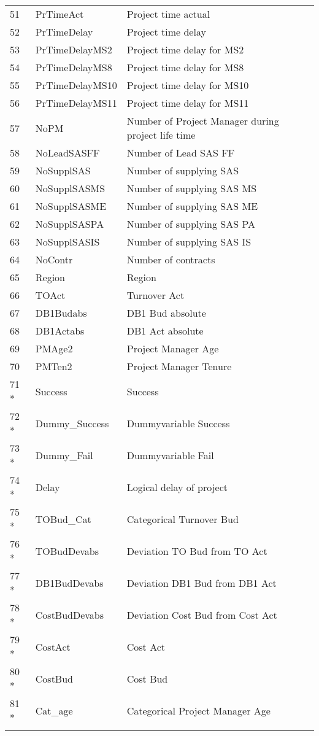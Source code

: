 \begin{longtable}[ht]{p{} p{}p{}}
	51    & PrTimeAct & Project time actual \\
	52    & PrTimeDelay & Project time delay \\
	53    & PrTimeDelayMS2 & Project time delay for MS2 \\
	54    & PrTimeDelayMS8 & Project time delay for MS8 \\
	55    & PrTimeDelayMS10 & Project time delay for MS10 \\
	56    & PrTimeDelayMS11 & Project time delay for MS11 \\
	57    & NoPM  & Number of Project Manager during project life time \\
	58    & NoLeadSASFF & Number of Lead SAS FF \\
	59    & NoSupplSAS & Number of supplying SAS \\
	60    & NoSupplSASMS & Number of supplying SAS MS \\
	61    & NoSupplSASME & Number of supplying SAS ME \\
	62    & NoSupplSASPA & Number of supplying SAS PA \\
	63    & NoSupplSASIS & Number of supplying SAS IS \\
	64    & NoContr & Number of contracts \\
	65    & Region & Region \\
	66    & TOAct & Turnover Act \\
	67    & DB1Budabs & DB1 Bud absolute \\
	68    & DB1Actabs & DB1 Act absolute \\
	69    & PMAge2 & Project Manager Age \\
	70    & PMTen2 & Project Manager Tenure \\
	71 *   & Success & Success \\
	72 *  & Dummy\_Success & Dummyvariable Success \\
	73 *   & Dummy\_Fail & Dummyvariable Fail \\
	74 *   & Delay & Logical delay of project \\
	75 *   & TOBud\_Cat & Categorical Turnover Bud \\
	76 *   & TOBudDevabs & Deviation TO Bud from TO Act \\
	77 *   & DB1BudDevabs & Deviation DB1 Bud from DB1 Act \\
	78 *   & CostBudDevabs & Deviation Cost Bud from Cost Act \\
	79 *   & CostAct & Cost Act \\
	80 *   & CostBud & Cost Bud \\
	81 *   & Cat\_age & Categorical Project Manager Age \\
	\label{tab:addlabel}%
\end{longtable}%
